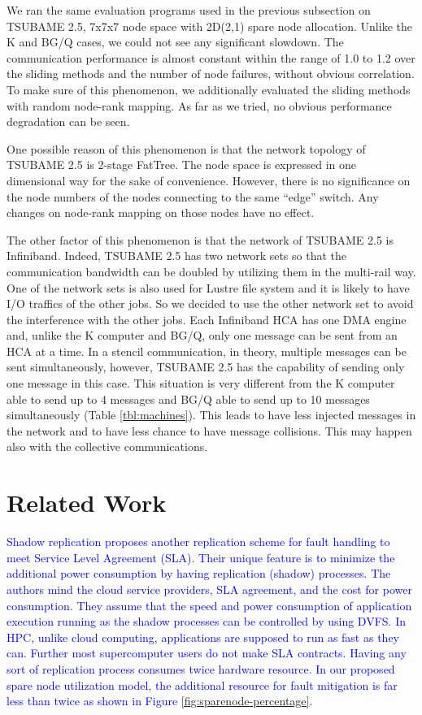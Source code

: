 \documentclass[Afour,times,sagev]{sagej}
\newcommand{\AH}[1]{%
  \textcolor{blue}{#1}}%
\begin{document}
We ran the same evaluation programs used in the previous subsection on
TSUBAME 2.5, 7x7x7 node space with 2D(2,1) spare node
allocation. Unlike the K and BG/Q cases,
we could not see any significant slowdown. The communication
performance is almost constant within the range of 1.0 to 1.2 over the
sliding methods and the number of node failures, without obvious
correlation. To make sure of this phenomenon, we additionally
evaluated the sliding methods with random node-rank mapping. As far as
we tried, no obvious performance degradation can be seen.

One possible reason of this phenomenon is that the network topology of
TSUBAME 2.5 is 2-stage FatTree. The node space is expressed in one
dimensional way for the sake of convenience. However, there is no
significance on the node numbers of the nodes connecting to the same
``edge'' switch. Any changes on node-rank mapping on those nodes have
no effect.

The other factor of this phenomenon is that the network of TSUBAME 2.5
is Infiniband. Indeed, TSUBAME 2.5 has two network sets so that the
communication bandwidth can be doubled by utilizing them in the
multi-rail way\cite{1392963}. One of the network sets is also used for
Lustre file system and it is likely to have I/O traffics of the other
jobs. So we decided to use the other network set to
avoid the interference with the other jobs. Each Infiniband HCA has
one DMA engine and, unlike the K computer and BG/Q, only one message
can be sent from an HCA at a time. In a stencil communication, in
theory, multiple messages can be sent simultaneously, however, TSUBAME
2.5 has the capability of sending only one message in this case. This
situation is very different from the K computer able to send up to 4
messages and BG/Q able to send up to 10 messages simultaneously (Table
\ref{tbl:machines}). This leads to have less injected messages in the
network and to have less chance to have message collisions. This may
happen also with the collective communications.

\section{Related Work}\label{sec:related-work}

\AH{Shadow replication proposes another replication scheme
for fault handling to meet Service Level Agreement
(SLA)\cite{6785308}. Their unique feature is to minimize the
additional power consumption by having replication (shadow)
processes. The authors mind the cloud service providers, SLA
agreement, and the cost for power consumption. They assume that the
speed and power consumption of application execution running as the
shadow processes can be controlled by using DVFS. In HPC, unlike cloud
computing, applications are supposed to run as fast as they
can. Further most supercomputer users do not make
SLA contracts. Having any sort of replication process consumes twice
hardware resource.  In our proposed spare node utilization model, the
additional resource for fault mitigation is far less than twice as
shown in Figure \ref{fig:sparenode-percentage}.
}
\end{document}

